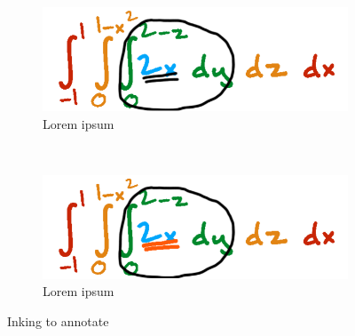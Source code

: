 \begin{figure}[t!]
    \centering
    \begin{subfigure}[t]{0.5\columnwidth}
        \centering
        \includegraphics[width=1\columnwidth]{figures/annotate_presenter}
        \caption{Lorem ipsum}
    \end{subfigure}%
    ~ 
    \begin{subfigure}[t]{0.5\columnwidth}
        \centering
        \includegraphics[width=1\columnwidth]{figures/annotate_audience}
        \caption{Lorem ipsum}
    \end{subfigure}
      
    \caption{Inking to annotate}
\end{figure}

